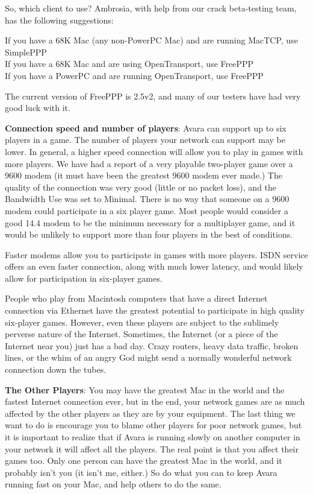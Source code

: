 \documentclass{article}
\begin{document}
So, which client to use? Ambrosia, with help from our crack beta-testing team, has the following suggestions:

If you have a 68K Mac (any non-PowerPC Mac) and are running MacTCP, use SimplePPP\\
If you have a 68K Mac and are using OpenTransport, use FreePPP\\
If you have a PowerPC and are running OpenTransport, use FreePPP

The current version of FreePPP is 2.5v2, and many of our testers have had very good luck with it.

\textbf{Connection speed and number of players}: Avara can support up to six players in a game. The number of players your network can support may be lower. In general, a higher speed connection will allow you to play in games with more players. We have had a report of a very playable two-player game over a 9600 modem (it must have been the greatest 9600 modem ever made.) The quality of the connection was very good (little or no packet loss), and the Bandwidth Use was set to Minimal. There is no way that someone on a 9600 modem could participate in a six player game. Most people would consider a good 14.4 modem to be the minimum necessary for a multiplayer game, and it would be unlikely to support more than four players in the best of conditions.

Faster modems allow you to participate in games with more players. ISDN service offers an even faster connection, along with much lower latency, and would likely allow for participation in six-player games.

People who play from Macintosh computers that have a direct Internet connection via Ethernet have the greatest potential to participate in high quality six-player games. However, even these players are subject to the sublimely perverse nature of the Internet. Sometimes, the Internet (or a piece of the Internet near you) just has a bad day. Crazy routers, heavy data traffic, broken lines, or the whim of an angry God might send a normally wonderful network connection down the tubes.

\textbf{The Other Players}: You may have the greatest Mac in the world and the fastest Internet connection ever, but in the end, your network games are as much affected by the other players as they are by your equipment. The last thing we want to do is encourage you to blame other players for poor network games, but it is important to realize that if Avara is running slowly on another computer in your network it will affect all the players. The real point is that you affect their games too. Only one person can have the greatest Mac in the world, and it probably isn't you (it isn't me, either.) So do what you can to keep Avara running fast on your Mac, and help others to do the same.
\end{document}
